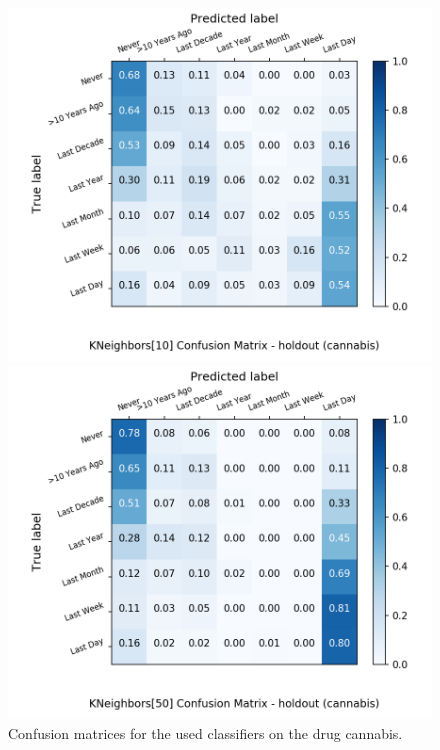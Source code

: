 \begin{figure}[H]
\begin{minipage}[b]{0.32\textwidth}
		\includegraphics[width=1.1\textwidth]{Plots/cannabis_KNeighbors_10_balance_False_holdout.png}
  \end{minipage}
	\begin{minipage}[b]{0.32\textwidth}
		\includegraphics[width=1.1\textwidth]{Plots/cannabis_KNeighbors_50_balance_False_holdout.png}
  \end{minipage}
	\caption{Confusion matrices for the used classifiers on the drug cannabis.}
\end{figure}

